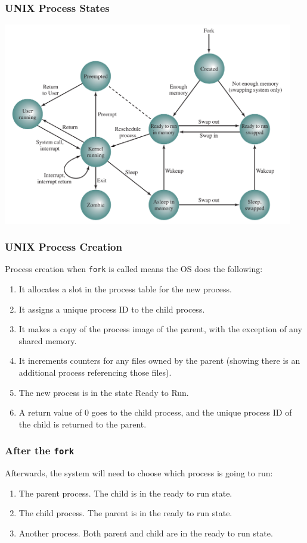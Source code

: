 \begin{frame}
\frametitle{UNIX Process States}

\begin{center}
\includegraphics[width=0.95\textwidth]{images/unix-states.png}
\end{center}

\end{frame}

\begin{frame}
\frametitle{UNIX Process Creation}

Process creation when \texttt{fork} is called means the OS does the following:

\begin{enumerate}
	\item It allocates a slot in the process table for the new process.
	\item It assigns a unique process ID to the child process.
	\item It makes a copy of the process image of the parent, with the exception of any shared memory.
	\item It increments counters for any files owned by the parent (showing there is an additional process referencing those files).
	\item The new process is in the state Ready to Run.
	\item A return value of 0 goes to the child process, and the unique process ID of the child is returned to the parent.
\end{enumerate}

\end{frame}

\begin{frame}
\frametitle{After the \texttt{fork}}

Afterwards, the system will need to choose which process is going to run: 

\begin{enumerate}
	\item The parent process. The child is in the ready to run state.
	\item The child process. The parent is in the ready to run state.
	\item Another process. Both parent and child are in the ready to run state.
\end{enumerate}

\end{frame}


